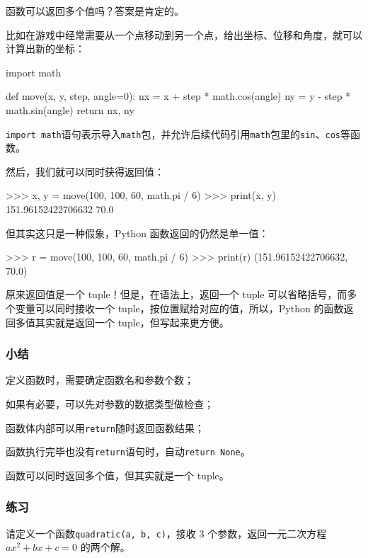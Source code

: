函数可以返回多个值吗？答案是肯定的。

比如在游戏中经常需要从一个点移动到另一个点，给出坐标、位移和角度，就可以计算出新的坐标：

\begin{pythoncode}
import math

def move(x, y, step, angle=0):
    nx = x + step * math.cos(angle)
    ny = y - step * math.sin(angle)
    return nx, ny
\end{pythoncode}

\texttt{import\ math}语句表示导入\texttt{math}包，并允许后续代码引用\texttt{math}包里的\texttt{sin}、\texttt{cos}等函数。

然后，我们就可以同时获得返回值：

\begin{pythoncode}
>>> x, y = move(100, 100, 60, math.pi / 6)
>>> print(x, y)
151.96152422706632 70.0
\end{pythoncode}

但其实这只是一种假象，Python 函数返回的仍然是单一值：

\begin{pythoncode}
>>> r = move(100, 100, 60, math.pi / 6)
>>> print(r)
(151.96152422706632, 70.0)
\end{pythoncode}

原来返回值是一个 tuple！但是，在语法上，返回一个 tuple
可以省略括号，而多个变量可以同时接收一个
tuple，按位置赋给对应的值，所以，Python 的函数返回多值其实就是返回一个
tuple，但写起来更方便。

\hypertarget{ux5c0fux7ed3}{%
\subsubsection{小结}\label{ux5c0fux7ed3}}

定义函数时，需要确定函数名和参数个数；

如果有必要，可以先对参数的数据类型做检查；

函数体内部可以用\texttt{return}随时返回函数结果；

函数执行完毕也没有\texttt{return}语句时，自动\texttt{return\ None}。

函数可以同时返回多个值，但其实就是一个 tuple。

\hypertarget{ux7ec3ux4e60}{%
\subsubsection{练习}\label{ux7ec3ux4e60}}

请定义一个函数\texttt{quadratic(a,\ b,\ c)}，接收 3
个参数，返回一元二次方程 \(ax^2+bx+c=0\) 的两个解。

